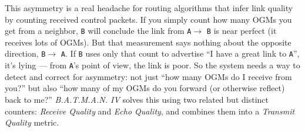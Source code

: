This asymmetry is a real headache for routing algorithms that infer link quality by counting received control packets. If you simply count how many OGMs you get from a neighbor, \texttt{B} will conclude the link from \texttt{A}$\to$ \texttt{B} is near perfect (it receives lots of OGMs). But that measurement says nothing about the opposite direction, \texttt{B}$\to$ \texttt{A}. If \texttt{B} uses only that count to advertise “I have a great link to \texttt{A}”, it’s lying — from \texttt{A}’s point of view, the link is poor.
So the system needs a way to detect and correct for asymmetry: not just “how many OGMs do I receive from you?” but also “how many of my OGMs do you forward (or otherwise reflect) back to me?” \textit{B.A.T.M.A.N. IV} solves this using two related but distinct counters: \textit{Receive Quality} and \textit{Echo Quality}, and combines them into a \textit{Transmit Quality} metric.

